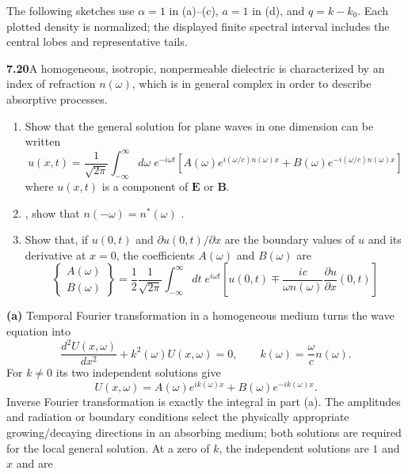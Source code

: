 The following sketches use $\alpha=1$ in (a)--(c), $a=1$ in (d), and
$q=k-k_0$. Each plotted density is normalized; the displayed finite
spectral interval includes the central lobes and representative tails.
\begin{center}

\end{center}

\par\bigskip
\noindent\textbf{7.20}\quad A homogeneous, isotropic, nonpermeable dielectric is characterized by an index of refraction $n(\omega)$, which is in general complex in order to describe absorptive processes.
\begin{enumerate}
\item[(a)] Show that the general solution for plane waves in one dimension can be written
\[
u(x,t)=\frac{1}{\sqrt{2\pi}}\int_{-\infty}^{\infty}d\omega\;e^{-i\omega t}[A(\omega)e^{i(\omega/c)n(\omega)x}+B(\omega)e^{-i(\omega/c)n(\omega)x}]
\]
where $u(x,t)$ is a component of $\mathbf{E}$ or $\mathbf{B}$.
\item[(b)] , show that $n(-\omega)=n^{*}(\omega)$ .
\item[(c)] Show that, if $u(0,t)$ and $\partial u(0,t)/\partial x$ are the boundary values of $u$ and its derivative at $x=0$, the coefficients $A(\omega)$ and $B(\omega)$ are
\[
\begin{Bmatrix}A(\omega)\\ B(\omega)\end{Bmatrix}
=\frac{1}{2}\frac{1}{\sqrt{2\pi}}\int_{-\infty}^{\infty}dt\;e^{i\omega t}\left[u(0,t)\mp\frac{ic}{\omega n(\omega)}\frac{\partial u}{\partial x}(0,t)\right]
\]
\end{enumerate}
\solution
\textbf{(a)} Temporal Fourier transformation in a homogeneous
medium turns the wave equation into
\[
\frac{d^2U(x,\omega)}{dx^2}+k^2(\omega)U(x,\omega)=0,
\qquad k(\omega)=\frac\omega c n(\omega).
\]
For $k\ne0$ its two independent solutions give
\[
U(x,\omega)=A(\omega)e^{ik(\omega)x}
+B(\omega)e^{-ik(\omega)x}.
\]
Inverse Fourier transformation is exactly the integral in part (a).
The amplitudes and radiation or boundary conditions select the
physically appropriate growing/decaying directions in an absorbing
medium; both solutions are required for the local general solution.
At a zero of $k$, the independent solutions are $1$ and $x$ and are
